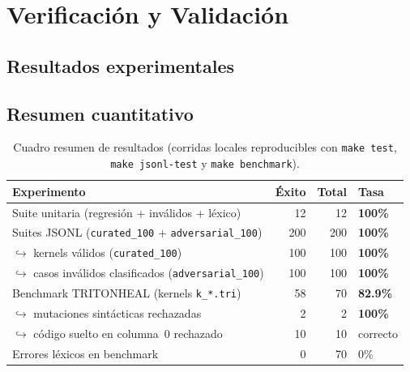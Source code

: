\section{Verificación y Validación}

\subsection{Resultados experimentales}
\label{sec:resultados}

\noindent{}

\vspace{0.8em}

\subsection{Resumen cuantitativo}
\begin{table}[H]
\centering
\caption{Cuadro resumen de resultados (corridas locales reproducibles con \texttt{make test}, \texttt{make jsonl-test} y \texttt{make benchmark}).}
\label{tab:resumen-global}
\begin{tabular}{@{}lrrp{4.8cm}@{}}
\toprule
\textbf{Experimento} & \textbf{Éxito} & \textbf{Total} & \textbf{Tasa} \\
\midrule
Suite unitaria (regresión + inválidos + léxico) & 12 & 12 & \textbf{100\%} \\
Suites JSONL (\texttt{curated\_100} + \texttt{adversarial\_100}) & 200 & 200 & \textbf{100\%} \\
\quad $\hookrightarrow$ kernels válidos (\texttt{curated\_100}) & 100 & 100 & \textbf{100\%} \\
\quad $\hookrightarrow$ casos inválidos clasificados (\texttt{adversarial\_100}) & 100 & 100 & \textbf{100\%} \\
Benchmark TRITONHEAL (kernels \texttt{k\_*.tri}) & 58 & 70 & \textbf{82.9\%} \\
\quad $\hookrightarrow$ mutaciones sintácticas rechazadas & 2 & 2 & \textbf{100\%} \\
\quad $\hookrightarrow$ código suelto en columna~0 rechazado & 10 & 10 & correcto \\
Errores léxicos en benchmark & 0 & 70 & 0\% \\
\bottomrule
\end{tabular}
\end{table}

